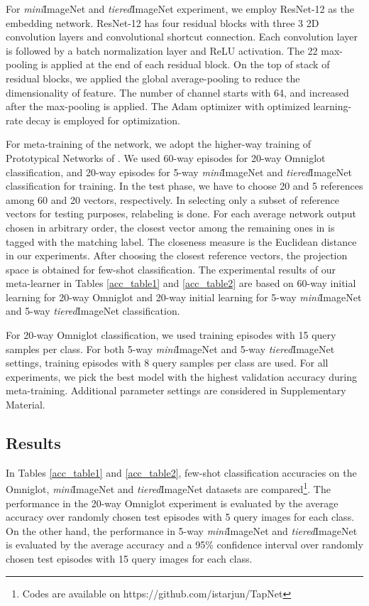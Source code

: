 \documentclass{article}
\begin{document}
For \textit{mini}ImageNet and \textit{tiered}ImageNet experiment, we employ ResNet-12 \cite{Resnet} as the embedding network. ResNet-12 has four residual blocks with three 3 2D convolution layers and convolutional shortcut connection. Each convolution layer is followed by a batch normalization layer and ReLU activation. The 22 max-pooling is applied at the end of each residual block. On the top of stack of residual blocks, we applied the global average-pooling to reduce the dimensionality of feature. The number of channel starts with 64, and increased after the max-pooling is applied. The Adam optimizer \cite{Adam} with optimized learning-rate decay is employed for optimization.
\fi


For meta-training of the network, we adopt the higher-way training of Prototypical Networks of \cite{PN}. We used 60-way episodes for 20-way Omniglot classification, and 20-way episodes for 5-way \textit{mini}ImageNet and \textit{tiered}ImageNet classification for training. In the test phase, we have to choose 20 and 5 references among 60 and 20 vectors, respectively. In selecting only a subset of reference vectors for testing purposes, relabeling is done. For each average network output chosen in arbitrary order, the closest vector among the remaining ones in  is tagged with the matching label.
The closeness measure is the Euclidean distance in our experiments. 
After choosing the closest reference vectors, the projection space  is obtained for few-shot classification. The experimental results of our meta-learner in Tables \ref{acc_table1} and \ref{acc_table2} are based on 60-way initial learning for 20-way Omniglot and 20-way initial learning for 5-way \textit{mini}ImageNet and 5-way \textit{tiered}ImageNet classification.

For 20-way Omniglot classification, we used  training episodes with 15 query samples per class. For both 5-way \textit{mini}ImageNet and 5-way \textit{tiered}ImageNet settings,  training episodes with 8 query samples per class are used. For all experiments, we pick the best model with the highest validation accuracy during meta-training. Additional parameter settings are considered in Supplementary Material.
\subsection{Results}



In Tables \ref{acc_table1} and \ref{acc_table2}, few-shot classification accuracies on the Omniglot, \textit{mini}ImageNet and \textit{tiered}ImageNet datasets are compared\footnote{Codes are available on https://github.com/istarjun/TapNet}. The performance in the 20-way Omniglot experiment is evaluated by the average accuracy over randomly chosen  test episodes with 5 query images for each class. On the other hand, the performance in 5-way \textit{mini}ImageNet and \textit{tiered}ImageNet is evaluated by the average accuracy and a 95\% confidence interval over randomly chosen  test episodes with 15 query images for each class. 
\end{document}
